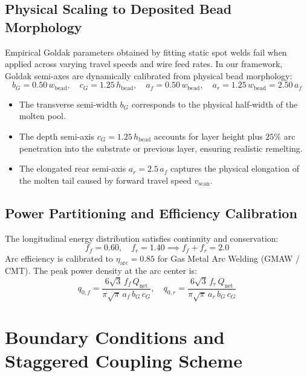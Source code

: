 \documentclass[10pt,a4paper]{article}
\begin{document}
\subsection{Physical Scaling to Deposited Bead Morphology}
Empirical Goldak parameters obtained by fitting static spot welds fail when applied across varying travel speeds and wire feed rates. In our framework, Goldak semi-axes are dynamically calibrated from physical bead morphology:
\begin{equation}
b_G = 0.50\,w_{\mathrm{bead}}, \quad c_G = 1.25\,h_{\mathrm{bead}}, \quad a_f = 0.50\,w_{\mathrm{bead}}, \quad a_r = 1.25\,w_{\mathrm{bead}} = 2.50\,a_f
\end{equation}
\begin{itemize}
    \item The transverse semi-width $b_G$ corresponds to the physical half-width of the molten pool.
    \item The depth semi-axis $c_G = 1.25\,h_{\mathrm{bead}}$ accounts for layer height plus $25\%$ arc penetration into the substrate or previous layer, ensuring realistic remelting.
    \item The elongated rear semi-axis $a_r = 2.5\,a_f$ captures the physical elongation of the molten tail caused by forward travel speed $v_{\mathrm{scan}}$.
\end{itemize}

\subsection{Power Partitioning and Efficiency Calibration}
The longitudinal energy distribution satisfies continuity and conservation:
\begin{equation}
f_f = 0.60, \quad f_r = 1.40 \implies f_f + f_r = 2.0
\end{equation}
Arc efficiency is calibrated to $\eta_{\mathrm{arc}} = 0.85$ for Gas Metal Arc Welding (GMAW / CMT). The peak power density at the arc center is:
\begin{equation}
q_{0,f} = \frac{6\sqrt{3}\,f_f\,Q_{\mathrm{net}}}{\pi\sqrt{\pi}\,a_f\,b_G\,c_G}, \quad q_{0,r} = \frac{6\sqrt{3}\,f_r\,Q_{\mathrm{net}}}{\pi\sqrt{\pi}\,a_r\,b_G\,c_G}
\end{equation}

\section{Boundary Conditions and Staggered Coupling Scheme}
\end{document}

